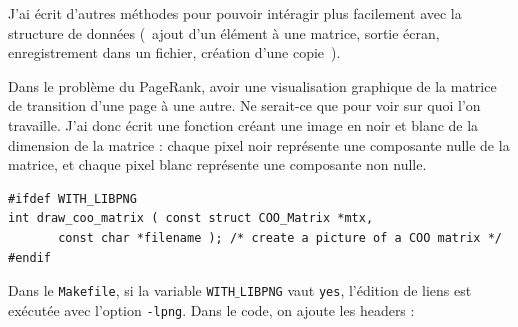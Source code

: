 \documentclass[a4paper,12pt]{article}
\begin{document}
\bigskip

J'ai écrit d'autres méthodes pour pouvoir intéragir plus facilement avec la structure de données (~ajout d'un élément à une matrice, sortie écran, enregistrement dans un fichier, création d'une copie~).

\bigskip

Dans le problème du PageRank, avoir une visualisation graphique de la matrice de transition d'une page à une autre. Ne serait-ce que pour \og voir \fg{} sur quoi l'on travaille. J'ai donc écrit une fonction créant une image en noir et blanc de la dimension de la matrice : chaque pixel noir représente une composante nulle de la matrice, et chaque pixel blanc représente une composante non nulle.
\begin{lstlisting}
#ifdef WITH_LIBPNG
int draw_coo_matrix ( const struct COO_Matrix *mtx, 
       const char *filename ); /* create a picture of a COO matrix */
#endif
\end{lstlisting}

Dans le \texttt{Makefile}, si la variable \texttt{WITH$\_$LIBPNG} vaut \texttt{yes}, l'édition de liens est exécutée avec l'option \texttt{-lpng}. Dans le code, on ajoute les headers :
\end{document}
